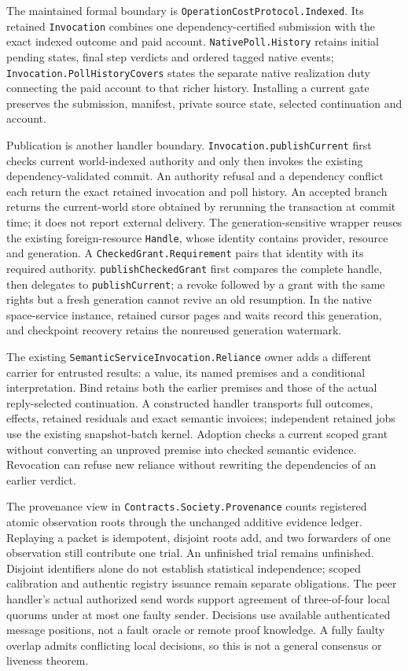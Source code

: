 \documentclass[11pt]{article}
\theoremstyle{definition}
\theoremstyle{remark}
\begin{document}
The maintained formal boundary is
\nolinkurl{OperationCostProtocol.Indexed}.  Its retained
\nolinkurl{Invocation} combines one dependency-certified submission with the
exact indexed outcome and paid account.  \nolinkurl{NativePoll.History} retains
initial pending states, final step verdicts and ordered tagged native events;
\nolinkurl{Invocation.PollHistoryCovers} states the separate native realization
duty connecting the paid account to that richer history.  Installing a current
gate preserves the submission, manifest, private source state, selected
continuation and account.

Publication is another handler boundary.
\nolinkurl{Invocation.publishCurrent} first checks current world-indexed
authority and only then invokes the existing dependency-validated commit.  An
authority refusal and a dependency conflict each return the exact retained
invocation and poll history.  An accepted branch returns the current-world
store obtained by rerunning the transaction at commit time; it does not report
external delivery.  The generation-sensitive wrapper reuses the existing
foreign-resource \nolinkurl{Handle}, whose identity contains provider,
resource and generation.  A \nolinkurl{CheckedGrant.Requirement} pairs that
identity with its required authority.  \nolinkurl{publishCheckedGrant} first
compares the complete handle, then delegates to \nolinkurl{publishCurrent}; a
revoke followed by a grant with the same rights but a fresh generation cannot
revive an old resumption.  In the native space-service instance, retained
cursor pages and waits record this generation, and checkpoint recovery retains
the nonreused generation watermark.

The existing \nolinkurl{SemanticServiceInvocation.Reliance} owner adds a
different carrier for entrusted results: a value, its named premises and a
conditional interpretation. Bind retains both the earlier premises and those
of the actual reply-selected continuation. A constructed handler transports
full outcomes, effects, retained residuals and exact semantic invoices;
independent retained jobs use the existing snapshot-batch kernel. Adoption
checks a current scoped grant without converting an unproved premise into
checked semantic evidence. Revocation can refuse new reliance without
rewriting the dependencies of an earlier verdict.

The provenance view in \nolinkurl{Contracts.Society.Provenance} counts
registered atomic observation roots through the unchanged additive evidence
ledger. Replaying a packet is idempotent, disjoint roots add, and two
forwarders of one observation still contribute one trial. An unfinished trial
remains unfinished. Disjoint identifiers alone do not establish statistical
independence; scoped calibration and authentic registry issuance remain
separate obligations. The peer handler's actual authorized send words support
agreement of three-of-four local quorums under at most one faulty sender.
Decisions use available authenticated message positions, not a fault oracle
or remote proof knowledge. A fully faulty overlap admits conflicting local
decisions, so this is not a general consensus or liveness theorem.
\end{document}
